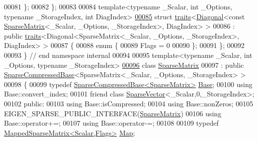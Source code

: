 \begin{DoxyCode}
00081   \};
00082 \};
00083 
00084 \textcolor{keyword}{template}<\textcolor{keyword}{typename} \_Scalar, \textcolor{keywordtype}{int} \_Options, \textcolor{keyword}{typename} \_StorageIndex, \textcolor{keywordtype}{int} DiagIndex>
\hyperlink{struct_eigen_1_1internal_1_1traits_3_01_diagonal_3_01const_01_sparse_matrix_3_01___scalar_00_01_60e2cc1eeaa955bbaca3dbe42dd8c748}{00085} \textcolor{keyword}{struct }\hyperlink{struct_eigen_1_1internal_1_1traits}{traits}<\hyperlink{group___core___module_class_eigen_1_1_diagonal}{Diagonal}<const \hyperlink{group___sparse_core___module_class_eigen_1_1_sparse_matrix}{SparseMatrix}<\_Scalar, \_Options, \_StorageIndex>, 
      DiagIndex> >
00086  : \textcolor{keyword}{public} \hyperlink{struct_eigen_1_1internal_1_1traits}{traits}<Diagonal<SparseMatrix<\_Scalar, \_Options, \_StorageIndex>, DiagIndex> >
00087 \{
00088   \textcolor{keyword}{enum} \{
00089     Flags = 0
00090   \};
00091 \};
00092 
00093 \} \textcolor{comment}{// end namespace internal}
00094 
00095 \textcolor{keyword}{template}<\textcolor{keyword}{typename} \_Scalar, \textcolor{keywordtype}{int} \_Options, \textcolor{keyword}{typename} \_StorageIndex>
\hyperlink{group___sparse_core___module}{00096} \textcolor{keyword}{class }\hyperlink{group___sparse_core___module_class_eigen_1_1_sparse_matrix}{SparseMatrix}
00097   : \textcolor{keyword}{public} \hyperlink{group___sparse_core___module_class_eigen_1_1_sparse_compressed_base}{SparseCompressedBase}<SparseMatrix<\_Scalar, \_Options, \_StorageIndex> >
00098 \{
00099     \textcolor{keyword}{typedef} \hyperlink{group___sparse_core___module_class_eigen_1_1_sparse_compressed_base}{SparseCompressedBase<SparseMatrix>} 
      \hyperlink{group___sparse_core___module_class_eigen_1_1_sparse_compressed_base}{Base};
00100     \textcolor{keyword}{using} Base::convert\_index;
00101     \textcolor{keyword}{friend} \textcolor{keyword}{class }\hyperlink{group___sparse_core___module_class_eigen_1_1_sparse_vector}{SparseVector}<\_Scalar,0,\_StorageIndex>;
00102   \textcolor{keyword}{public}:
00103     \textcolor{keyword}{using} Base::isCompressed;
00104     \textcolor{keyword}{using} Base::nonZeros;
00105     EIGEN\_SPARSE\_PUBLIC\_INTERFACE(\hyperlink{group___sparse_core___module_class_eigen_1_1_sparse_matrix}{SparseMatrix})
00106     \textcolor{keyword}{using} Base::operator+=;
00107     \textcolor{keyword}{using} Base::operator-=;
00108 
00109     \textcolor{keyword}{typedef} \hyperlink{class_eigen_1_1_mapped_sparse_matrix}{MappedSparseMatrix<Scalar,Flags>} \hyperlink{class_eigen_1_1_mapped_sparse_matrix}{Map};

\end{DoxyCode}
